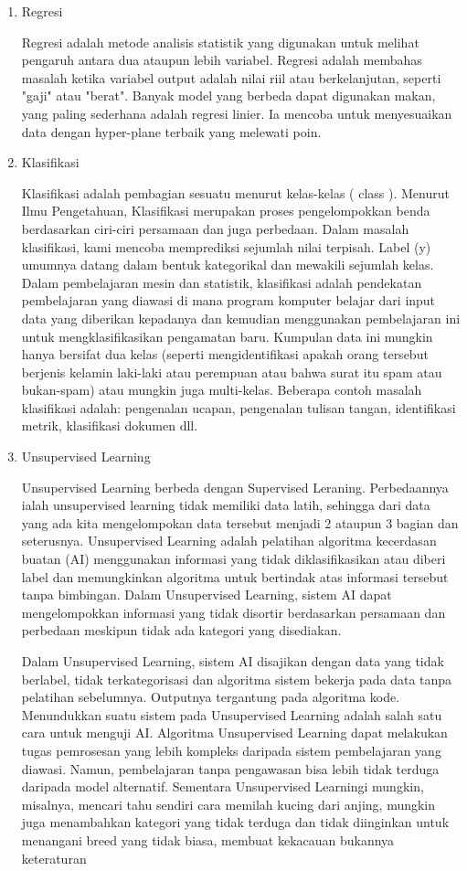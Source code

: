 \begin{enumerate}
    \item{Regresi}
    \par Regresi adalah metode analisis statistik yang digunakan untuk melihat pengaruh antara dua ataupun lebih variabel. Regresi adalah membahas masalah ketika variabel output adalah nilai riil atau berkelanjutan, seperti "gaji" atau "berat". Banyak model yang berbeda dapat digunakan makan, yang paling sederhana adalah regresi linier. Ia mencoba untuk menyesuaikan data dengan hyper-plane terbaik yang melewati poin.

    \item{Klasifikasi}
    \par Klasifikasi adalah pembagian sesuatu menurut kelas-kelas ( class ). Menurut Ilmu Pengetahuan, Klasifikasi merupakan proses pengelompokkan benda berdasarkan ciri-ciri persamaan dan juga perbedaan. Dalam masalah klasifikasi, kami mencoba memprediksi sejumlah nilai terpisah. Label (y) umumnya datang dalam bentuk kategorikal dan mewakili sejumlah kelas. Dalam pembelajaran mesin dan statistik, klasifikasi adalah pendekatan pembelajaran yang diawasi di mana program komputer belajar dari input data yang diberikan kepadanya dan kemudian menggunakan pembelajaran ini untuk mengklasifikasikan pengamatan baru. Kumpulan data ini mungkin hanya bersifat dua kelas (seperti mengidentifikasi apakah orang tersebut berjenis kelamin laki-laki atau perempuan atau bahwa surat itu spam atau bukan-spam) atau mungkin juga multi-kelas. Beberapa contoh masalah klasifikasi adalah: pengenalan ucapan, pengenalan tulisan tangan, identifikasi metrik, klasifikasi dokumen dll.

    \item{Unsupervised Learning}
    \par Unsupervised Learning berbeda dengan Supervised Leraning. Perbedaannya ialah unsupervised learning tidak memiliki data latih, sehingga dari data yang ada kita mengelompokan data tersebut menjadi 2 ataupun 3 bagian dan seterusnya. Unsupervised Learning adalah pelatihan algoritma kecerdasan buatan (AI) menggunakan informasi yang tidak diklasifikasikan atau diberi label dan memungkinkan algoritma untuk bertindak atas informasi tersebut tanpa bimbingan. Dalam Unsupervised Learning, sistem AI dapat mengelompokkan informasi yang tidak disortir berdasarkan persamaan dan perbedaan meskipun tidak ada kategori yang disediakan.

    Dalam Unsupervised Learning, sistem AI disajikan dengan data yang tidak berlabel, tidak terkategorisasi dan algoritma sistem bekerja pada data tanpa pelatihan sebelumnya. Outputnya tergantung pada algoritma kode. Menundukkan suatu sistem pada Unsupervised Learning adalah salah satu cara untuk menguji AI. Algoritma Unsupervised Learning dapat melakukan tugas pemrosesan yang lebih kompleks daripada sistem pembelajaran yang diawasi. Namun, pembelajaran tanpa pengawasan bisa lebih tidak terduga daripada model alternatif. Sementara Unsupervised Learningi mungkin, misalnya, mencari tahu sendiri cara memilah kucing dari anjing, mungkin juga menambahkan kategori yang tidak terduga dan tidak diinginkan untuk menangani breed yang tidak biasa, membuat kekacauan bukannya keteraturan


\end{enumerate}
